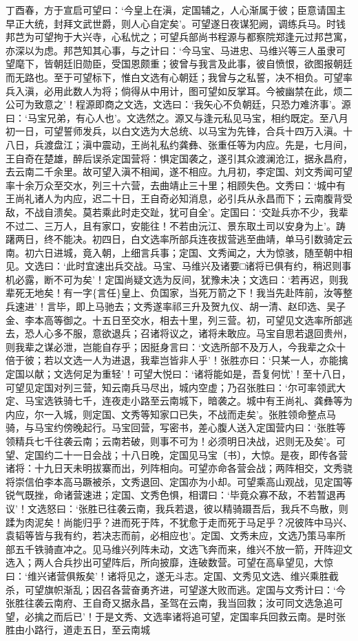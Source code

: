 \documentclass[]{article}
\begin{document}
丁酉春，方于宣启可望曰：`今皇上在滇，定国辅之，人心渐属于彼；臣意请国主早正大统，封拜文武世爵，则人心自定矣'。可望遂日夜谋犯阙，调练兵马。时钱邦芑为可望拘于大兴寺，心私忧之；可望兵部尚书程源与都察院郑逢元过邦芑寓，亦深以为虑。邦芑知其心事，与之计曰：`今马宝、马进忠、马维兴等三人虽隶可望麾下，皆朝廷旧勋臣，受国恩颇重；彼曾与我言及此事，彼自愤恨，欲图报朝廷而无路也。至于可望标下，惟白文选有心朝廷；我曾与之私誓，决不相负。可望率兵入滇，必用此数人为将；倘得从中用计，图可望如反掌耳。今被幽禁在此，烦二公可为致意之'！程源即商之文选，文选曰：`我矢心不负朝廷，只恐力难济事'。源曰：`马宝兄弟，有心人也'。文选然之。源又与逢元私见马宝，相约既定。至八月初一日，可望誓师发兵，以白文选为大总统、以马宝为先锋，合兵十四万入滇。十八日，兵渡盘江；滇中震动，王尚礼私约龚彝、张重任等为内应。先是，七月间，王自奇在楚雄，醉后误杀定国营将：惧定国袭之，遂引其众渡澜沧江，据永昌府，去云南二千余里。故可望入滇不相闻，遂不相应。九月初，李定国、刘文秀闻可望率十余万众至交水，列三十六营，去曲靖止三十里；相顾失色。文秀曰：`城中有王尚礼诸人为内应，迟二十日，王自奇必知消息，必引兵从永昌而下；云南腹背受敌，不战自溃矣。莫若乘此时走交趾，犹可自全'。定国曰：`交趾兵亦不少，我辈不过二、三万人，且有家口，安能往！不若由沅江、景东取土司以安身为上'。踌躇两日，终不能决。初四日，白文选率所部兵连夜拔营逃至曲靖，单马引数骑定云南。初六日进城，竟入朝，上细言兵事；定国、文秀闻之，大为惊骇，随至朝中相见。文选曰：`此时宜速出兵交战。马宝、马维兴及诸要□诸将已俱有约，稍迟则事机必露，断不可为矣'！定国尚疑文选为反间，犹豫未决；文选曰：`若再迟，则我辈死无地矣！有一字\{言任\}皇上、负国家，当死万箭之下！我当先赴阵前，汝等整兵速进'！言毕，即上马驰去；文秀遂率祁三升及贺九仪、胡一清、赵印选、吴子金、李本高等御之。十五日至交水，相去十里，列三营。初，可望见文选率所部逃去，恐人心多不服，意欲退兵；召诸将议之，诸将未敢应。马宝自思若退回贵州，则我辈之谋必泄，岂能自存乎；因挺身言曰：`文选所部不及万人，今我辈之众十倍于彼；若以文选一人为进退，我辈岂皆非人乎'！张胜亦曰：`只某一人，亦能擒定国以献；文选何足为重轻'！可望大悦曰：`诸将能如是，吾复何忧'！至十八日，可望见定国对列三营，知云南兵马尽出，城内空虚；乃召张胜曰：`尔可率领武大定、马宝选铁骑七千，连夜走小路至云南城下，暗袭之。城中有王尚礼、龚彝等为内应，尔一入城，则定国、文秀等知家口已失，不战而走矣'。张胜领命整点马骑，与马宝约傍晚起行。马宝回营，写密书，差心腹人送入定国营内曰：`张胜等领精兵七千往袭云南；云南若破，则事不可为！必须明日决战，迟则无及矣'。可望、定国约二十一日会战；十八日晚，定国见马宝〔书〕，大惊。是夜，即传各营诸将：十九日天未明拔寨而出，列阵相向。可望亦命各营会战；两阵相交，文秀骁将崇信伯李本高马蹶被杀，文秀退回、定国亦为小却。可望乘高山观战，见定国等锐气既挫，命诸营速进；定国、文秀色惧，相谓曰：`毕竟众寡不敌，不若暂退再议'！文选怒曰：`张胜已往袭云南，我兵若退，彼以精骑蹑吾后，我兵不鸟散，则蹂为肉泥矣！尚能归乎？进而死于阵，不犹愈于走而死于马足乎？况彼阵中马兴、袁韬等皆与我有约，若决志而前，必相应也'。定国、文秀未应，文选乃策马率所部五千铁骑直冲之。见马维兴列阵未动，文选飞奔而来，维兴不放一箭，开阵迎文选入；两人合兵抄出可望阵后，所向披靡，连破数营。可望在高阜望见，大惊曰：`维兴诸营俱叛矣'！诸将见之，遂无斗志。定国、文秀见文选、维兴乘胜截杀，可望旗帜渐乱；因召各营奋勇齐进，可望遂大败而逃。定国与文秀计曰：`今张胜往袭云南府、王自奇又据永昌，圣驾在云南，我当回救；汝可同文选急追可望，必擒之而后已'！于是文秀、文选率诸将追可望，定国率兵回救云南。是时张胜由小路行，道走五日，至云南城
\end{document}
